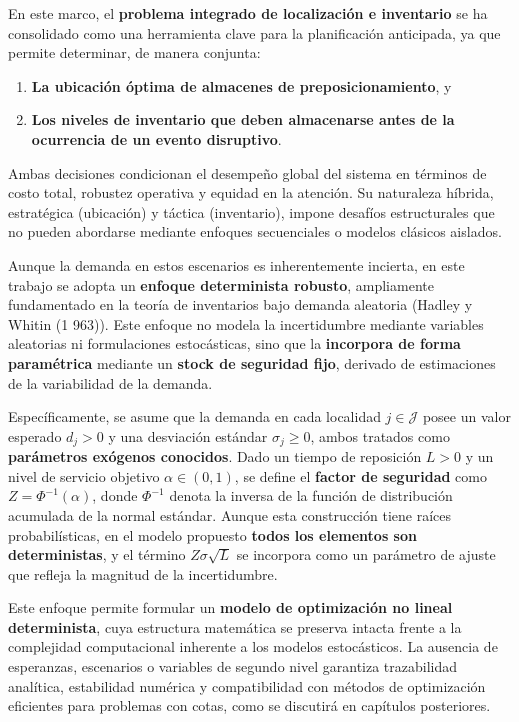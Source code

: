 \documentclass[
  spanish,
  us-letterpaper,
  DIV=11,
  numbers=noendperiod]{scrreprt}
\providecommand{\tightlist}{%
  \setlength{\itemsep}{0pt}\setlength{\parskip}{0pt}}
\numberwithin{equation}{section}
\begin{document}
En este marco, el \textbf{problema integrado de localización e
inventario} se ha consolidado como una herramienta clave para la
planificación anticipada, ya que permite determinar, de manera conjunta:

\begin{enumerate}
\def\labelenumi{\arabic{enumi}.}
\tightlist
\item
  \textbf{La ubicación óptima de almacenes de preposicionamiento}, y\\
\item
  \textbf{Los niveles de inventario que deben almacenarse antes de la
  ocurrencia de un evento disruptivo}.
\end{enumerate}

Ambas decisiones condicionan el desempeño global del sistema en términos
de costo total, robustez operativa y equidad en la atención. Su
naturaleza híbrida, estratégica (ubicación) y táctica (inventario),
impone desafíos estructurales que no pueden abordarse mediante enfoques
secuenciales o modelos clásicos aislados.

Aunque la demanda en estos escenarios es inherentemente incierta, en
este trabajo se adopta un \textbf{enfoque determinista robusto},
ampliamente fundamentado en la teoría de inventarios bajo demanda
aleatoria (Hadley y Whitin (1 963)). Este enfoque no modela la
incertidumbre mediante variables aleatorias ni formulaciones
estocásticas, sino que la \textbf{incorpora de forma paramétrica}
mediante un \textbf{stock de seguridad fijo}, derivado de estimaciones
de la variabilidad de la demanda.

Específicamente, se asume que la demanda en cada localidad
\(j\in\mathcal{J}\) posee un valor esperado \(d_j>0\) y una desviación
estándar \(\sigma_j\geq0\), ambos tratados como \textbf{parámetros
exógenos conocidos}. Dado un tiempo de reposición \(L>0\) y un nivel de
servicio objetivo \(\alpha\in(0,1)\), se define el \textbf{factor de
seguridad} como \(Z=\Phi^{-1}(\alpha)\), donde \(\Phi^{-1}\) denota la
inversa de la función de distribución acumulada de la normal estándar.
Aunque esta construcción tiene raíces probabilísticas, en el modelo
propuesto \textbf{todos los elementos son deterministas}, y el término
\(Z\sigma\sqrt{L}\) se incorpora como un parámetro de ajuste que refleja
la magnitud de la incertidumbre.

Este enfoque permite formular un \textbf{modelo de optimización no
lineal determinista}, cuya estructura matemática se preserva intacta
frente a la complejidad computacional inherente a los modelos
estocásticos. La ausencia de esperanzas, escenarios o variables de
segundo nivel garantiza trazabilidad analítica, estabilidad numérica y
compatibilidad con métodos de optimización eficientes para problemas con
cotas, como se discutirá en capítulos posteriores.
\end{document}
